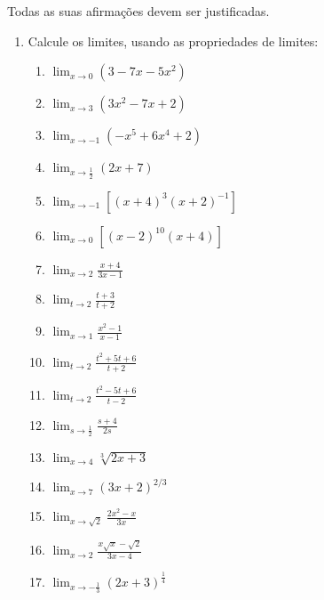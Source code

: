 
Todas as suas afirmações devem ser justificadas.

\begin{enumerate}

\item Calcule os limites, usando as propriedades de limites:
\begin{multicols}{3}
\begin{enumerate}
\item $ \displaystyle\lim_{x\longrightarrow 0} (3 -7x -5x^2)$
\item $\displaystyle\lim_{x\longrightarrow 3} (3x^2 -7x + 2)$
\item $\displaystyle\lim_{x\longrightarrow -1} (-x^5 + 6x^4 + 2)$
\item $\displaystyle\lim_{x\longrightarrow \frac{1}{2}} (2x + 7)$
\item $ \displaystyle\lim_{x\longrightarrow -1} [(x + 4)^3(x +
2)^{-1}]$ \item $ \displaystyle\lim_{x\longrightarrow 0}
[(x-2)^{10}(x + 4)]$ \item $ \displaystyle\lim_{x\longrightarrow
2} \displaystyle\frac{x + 4}{ 3x- 1}$
 \item
$ \displaystyle\lim_{t\longrightarrow 2} \displaystyle\frac{t +
3}{t + 2} $ \item $ \displaystyle\lim_{x\longrightarrow 1}
\displaystyle\frac{x^2-1}{ x- 1}$ \item $
\displaystyle\lim_{t\longrightarrow 2} \displaystyle\frac{t^2 + 5t
+ 6}{ t + 2} $ \item $\displaystyle\lim_{t\longrightarrow 2}
\displaystyle\frac{t^2 -5t + 6}{ t -2}$ \item
$\displaystyle\lim_{s\longrightarrow \frac{1}{ 2}}
\displaystyle\frac{s + 4}{ 2s} $ \item
$\displaystyle\lim_{x\longrightarrow 4}\displaystyle\sqrt[3]{2x +
3}$ \item $\displaystyle\lim_{x\longrightarrow 7} (3x + 2)^{2/3}$
\item $\displaystyle\lim_{x\longrightarrow \sqrt{ 2}}
\displaystyle\frac{2x^2 - x} {3x}$ \item
$\displaystyle\lim_{x\longrightarrow 2}
\displaystyle\frac{x\sqrt{x} - \sqrt{2}}{ 3x - 4}$ \item
$\displaystyle\lim_{x\longrightarrow -\frac{1}{ 3}} (2x +
3)^{\frac{1}{4}}$
\end{enumerate}
\end{multicols}



\end{enumerate}
